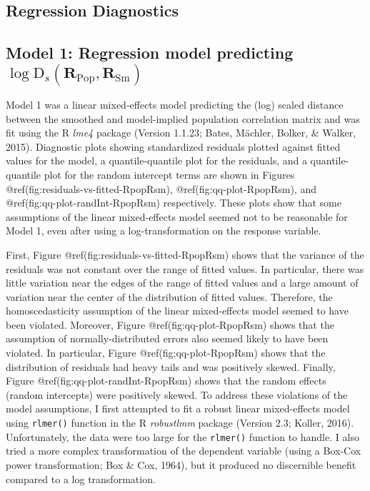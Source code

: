 \clearpage
\makeatletter
\efloat@restorefloats
\makeatother


\begin{appendix}
\hypertarget{regression-diagnostics}{%
\section{Regression Diagnostics}\label{regression-diagnostics}}

\hypertarget{model-1-regression-model-predicting-log-textrmd_smathbfr_textrmpop-mathbfr_textrmsm}{%
\subsection{\texorpdfstring{Model 1: Regression model predicting
\(\log \textrm{D}_s(\mathbf{R}_{\textrm{Pop}}, \mathbf{R}_{\textrm{Sm}})\)}{Model 1: Regression model predicting \textbackslash log \textbackslash textrm\{D\}\_s(\textbackslash mathbf\{R\}\_\{\textbackslash textrm\{Pop\}\}, \textbackslash mathbf\{R\}\_\{\textbackslash textrm\{Sm\}\})}}\label{model-1-regression-model-predicting-log-textrmd_smathbfr_textrmpop-mathbfr_textrmsm}}

Model 1 was a linear mixed-effects model predicting the (log) scaled
distance between the smoothed and model-implied population correlation
matrix and was fit using the R \emph{lme4} package (Version 1.1.23;
Bates, Mächler, Bolker, \& Walker, 2015). Diagnostic plots showing
standardized residuals plotted against fitted values for the model, a
quantile-quantile plot for the residuals, and a quantile-quantile plot
for the random intercept terms are shown in Figures
@ref(fig:residuals-vs-fitted-RpopRsm), @ref(fig:qq-plot-RpopRsm), and
@ref(fig:qq-plot-randInt-RpopRsm) respectively. These plots show that
some assumptions of the linear mixed-effects model seemed not to be
reasonable for Model 1, even after using a log-transformation on the
response variable.

First, Figure @ref(fig:residuals-vs-fitted-RpopRsm) shows that the
variance of the residuals was not constant over the range of fitted
values. In particular, there was little variation near the edges of the
range of fitted values and a large amount of variation near the center
of the distribution of fitted values. Therefore, the homoscedasticity
assumption of the linear mixed-effects model seemed to have been
violated. Moreover, Figure @ref(fig:qq-plot-RpopRsm) shows that the
assumption of normally-distributed errors also seemed likely to have
been violated. In particular, Figure @ref(fig:qq-plot-RpopRsm) shows
that the distribution of residuals had heavy tails and was positively
skewed. Finally, Figure @ref(fig:qq-plot-randInt-RpopRsm) shows that the
random effects (random intercepts) were positively skewed. To address
these violations of the model assumptions, I first attempted to fit a
robust linear mixed-effects model using \texttt{rlmer()} function in the
R \emph{robustlmm} package (Version 2.3; Koller, 2016). Unfortunately,
the data were too large for the \texttt{rlmer()} function to handle. I
also tried a more complex transformation of the dependent variable
(using a Box-Cox power transformation; Box \& Cox, 1964), but it
produced no discernible benefit compared to a log transformation.


\end{appendix}
